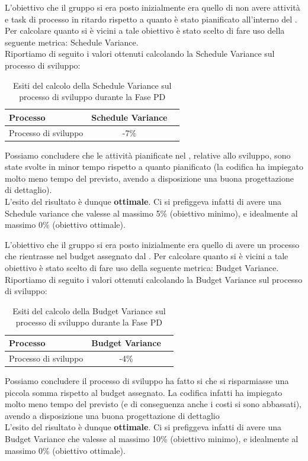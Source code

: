 				L'obiettivo che il gruppo si era posto inizialmente era quello di non avere attività e task di processo in ritardo rispetto a quanto è stato pianificato all'interno del . Per calcolare quanto si è vicini a tale obiettivo è stato scelto di fare uso della seguente metrica: Schedule Variance.\\
				Riportiamo di seguito i valori ottenuti calcolando la Schedule Variance sul processo di sviluppo:
				\begin{table}[H]
					\centering
					\begin{tabu}{| l | c | c |}
						\hline
						Processo 			   & Schedule Variance   \\ \hline \hline
						Processo di sviluppo   & -7\%                \\ \hline
					\end{tabu}
					\caption{Esiti del calcolo della Schedule Variance sul processo di sviluppo durante la Fase PD}
				\end{table}
				Possiamo concludere che le attività pianificate nel , relative allo sviluppo, sono state svolte in minor tempo rispetto a quanto pianificato (la codifica ha impiegato molto meno tempo del previsto, avendo a disposizione una buona progettazione di dettaglio).\\
				L'esito del risultato è dunque \textbf{ottimale}. Ci si prefiggeva infatti di avere una Schedule variance che valesse al massimo 5\% (obiettivo minimo), e idealmente al massimo 0\% (obiettivo ottimale).
						
				L'obiettivo che il gruppo si era posto inizialmente era quello di avere un processo che rientrasse nel budget assegnato dal . Per calcolare quanto si è vicini a tale obiettivo è stato scelto di fare uso della seguente metrica: Budget Variance.\\
				Riportiamo di seguito i valori ottenuti calcolando la Budget Variance sul processo di sviluppo:
				\begin{table}[H]
					\centering
					\begin{tabu}{| l | c | c |}
						\hline
						Processo 			   & Budget Variance     \\ \hline \hline
						Processo di sviluppo   & -4\%                 \\ \hline
					\end{tabu}
					\caption{Esiti del calcolo della Budget Variance sul processo di sviluppo durante la Fase PD}
				\end{table}
				Possiamo concludere il processo di sviluppo ha fatto si che si risparmiasse una piccola somma rispetto al budget assegnato. La codifica infatti ha impiegato molto meno tempo del previsto (e di conseguenza anche i costi si sono abbassati), avendo a disposizione una buona progettazione di dettaglio\\
				L'esito del risultato è dunque \textbf{ottimale}. Ci si prefiggeva infatti di avere una Budget Variance che valesse al massimo 10\% (obiettivo minimo), e idealmente al massimo 0\% (obiettivo ottimale).
							
